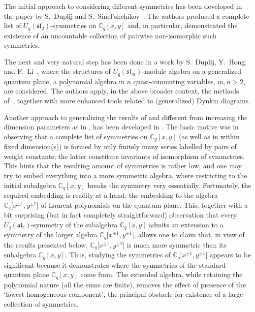 \documentclass[pdftex]{sigma}
\numberwithin{equation}{section}
\begin{document}
The initial approach to considering different symmetries has been developed in the paper by S.~Duplij and S.~Sinel'shchikov~\cite{DS}. The authors produced a complete list of $U_q(\mathfrak{sl}_2)$-symmetries on $\mathbb{C}_q[x,y]$ and, in particular, demonstrated the existence of an uncountable collection of pairwise non-isomorphic such symmetries.

The next and very natural step has been done in a work by S.~Duplij, Y.~Hong, and F.~Li~\cite{DHL}, where the structures of $U_q(\mathfrak{sl}_m)$-module algebra on a generalized quantum plane, a polynomial algebra in $n$
quasi-commuting variables, $m,n>2$, are considered. The authors apply, in the above broader context, the methods of~\cite{DS}, together with more enhanced tools related to (ge\-ne\-ralized) Dynkin diagrams.

Another approach to generalizing the results of \cite{DS} and different from increasing the dimension parameters as in \cite{DHL}, has been developed in \cite{S}. The basic motive was in observing that a complete list of symmetries on $\mathbb{C}_q[x,y]$ (as well as in \cite{DHL} within fixed dimension(s)) is formed by only finitely many series labelled by pairs of weight constants; the latter constitute invariants of isomorphism of symmetries. This hints that the resulting amount of symmetries is rather low, and one may try to embed everything into a more symmetric algebra, where restricting to the initial subalgebra $\mathbb{C}_q[x,y]$ breaks the symmetry very essentially. Fortunately, the required embedding is readily at a hand: the embedding to the algebra $\mathbb{C}_q\big[x^{\pm 1},y^{\pm 1}\big]$ of Laurent polynomials on the quantum plane. This, together with a bit surprising (but in fact completely straightforward) observation that every $U_q(\mathfrak{sl}_2)$-symmetry of the subalgebra $\mathbb{C}_q[x,y]$ admits an extension to a symmetry of the larger algebra $\mathbb{C}_q\big[x^{\pm 1},y^{\pm 1}\big]$, allows one to claim that, in view of the results presented below, $\mathbb{C}_q\big[x^{\pm 1},y^{\pm 1}\big]$ is much more symmetric than its subalgebra $\mathbb{C}_q[x,y]$. Thus, studying the symmetries of $\mathbb{C}_q\big[x^{\pm 1},y^{\pm 1}\big]$ appears to be significant because it demonstrates where the symmetries of the standard quantum plane $\mathbb{C}_q[x,y]$ come from. The extended algebra, while retaining the polynomial nature (all the sums are finite), removes the effect of presence of the `lowest homogeneous component', the principal obstacle for existence of a large collection of symmetries.
\end{document}
